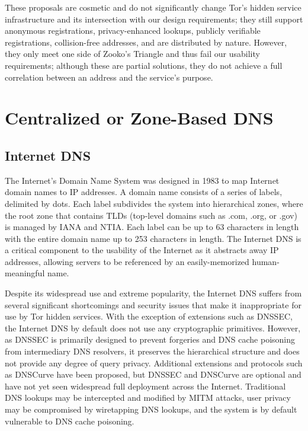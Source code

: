 These proposals are cosmetic and do not significantly change Tor's hidden service infrastructure and its intersection with our design requirements; they still support anonymous registrations, privacy-enhanced lookups, publicly verifiable registrations, collision-free addresses, and are distributed by nature. However, they only meet one side of Zooko's Triangle and thus fail our usability requirements; although these are partial solutions, they do not achieve a full correlation between an address and the service's purpose.

\section{Centralized or Zone-Based DNS}

\subsection{Internet DNS}

The Internet's Domain Name System was designed in 1983 to map Internet domain names to IP addresses. A domain name consists of a series of labels, delimited by dots. Each label subdivides the system into hierarchical zones, where the root zone that contains TLDs (top-level domains such as .com, .org, or .gov) is managed by IANA and NTIA. Each label can be up to 63 characters in length with the entire domain name up to 253 characters in length. The Internet DNS is a critical component to the usability of the Internet as it abstracts away IP addresses, allowing servers to be referenced by an easily-memorized human-meaningful name.

Despite its widespread use and extreme popularity, the Internet DNS suffers from several significant shortcomings and security issues that make it inappropriate for use by Tor hidden services. With the exception of extensions such as DNSSEC, the Internet DNS by default does not use any cryptographic primitives. However, as DNSSEC is primarily designed to prevent forgeries and DNS cache poisoning from intermediary DNS resolvers, it preserves the hierarchical structure and does not provide any degree of query privacy.\cite{wachs2014censorship} Additional extensions and protocols such as DNSCurve\cite{bernstein2009dnscurve} have been proposed, but DNSSEC and DNSCurve are optional and have not yet seen widespread full deployment across the Internet. Traditional DNS lookups may be intercepted and modified by MITM attacks, user privacy may be compromised by wiretapping DNS lookups, and the system is by default vulnerable to DNS cache poisoning.

